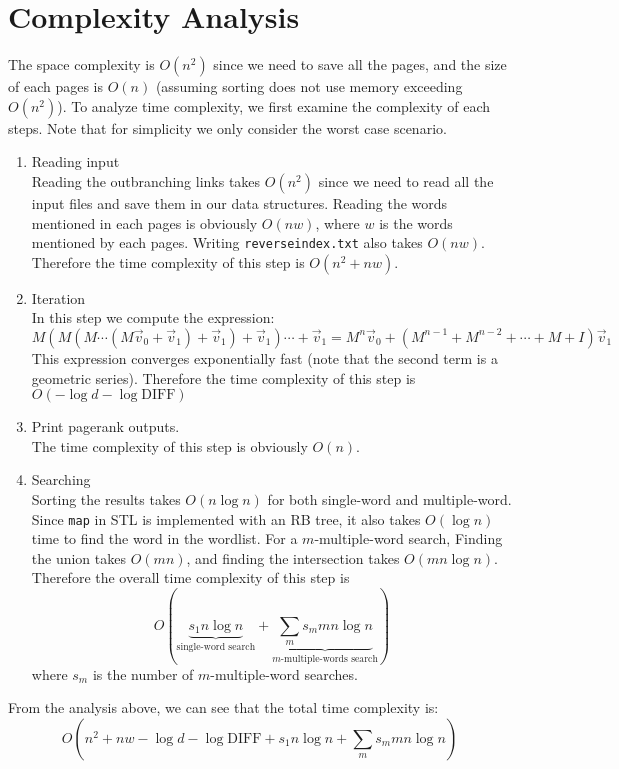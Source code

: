 \documentclass[12pt]{article}
\begin{document}
\section{Complexity Analysis}%
The space complexity is $O\left(n^2\right)$ since we need to save all the pages,
and the size of each pages is $O(n)$ (assuming sorting does not use memory exceeding
$O\left(n^2\right)$). To analyze time complexity, we first examine
the complexity of each steps. Note that for simplicity we only consider the worst
case scenario.

\begin{enumerate}
	\item Reading input\\
	Reading the outbranching links takes $O\left(n^2\right)$ since we need to
	read all the input files and save them in our data structures. Reading
	the words mentioned in each pages is obviously $O(nw)$, where $w$ is the words
	mentioned by each pages. Writing \texttt{reverseindex.txt} also takes
	$O(nw)$. Therefore the time complexity of this step is $O\left(n^2+nw\right)$.
		
	\item Iteration\\
	In this step we compute the expression:
	\begin{equation*}
		M(M(M \cdots (M\vec{v}_0 + \vec{v}_1) + \vec{v}_1 ) + \vec{v}_1) \cdots + \vec{v} _1 
		= M^n \vec{v}_0 + \left(M^{n-1} + M^{n-2} + \cdots+ M + I\right) \vec{v}_1 
	\end{equation*}
	This expression converges exponentially fast (note that the second term is 
	a geometric series). Therefore the time complexity of this step is
	$O\left(-\log d - \log \text{DIFF}\right)$

	\item Print pagerank outputs.\\
	The time complexity of this step is obviously $O(n)$.

	\item Searching\\
	Sorting the results takes $O(n\log n)$ for both single-word and multiple-word.
	Since \texttt{map} in STL is implemented with an RB tree, it also takes
	$O(\log n)$ time to find the word in the wordlist. For a $m$-multiple-word
	search, Finding the union takes $O(mn)$, and finding the intersection takes
	$O(mn\log n)$. Therefore the overall time complexity of this step is
	\begin{equation*}
		O\left(\underbrace{s_1 n \log n}_\text{single-word search} + 
		\underbrace{\sum_m s_m mn\log n}_{m\text{-multiple-words search}}\right)
	\end{equation*}
	where $s_m$ is the number of $m$-multiple-word searches.
\end{enumerate}
From the analysis above, we can see that the total time complexity is:
\begin{equation*}
	O\left(n^2 + nw -\log d - \log \text{DIFF} + s_1 n \log n + \sum_m s_m mn\log n\right)
\end{equation*}
\end{document}
